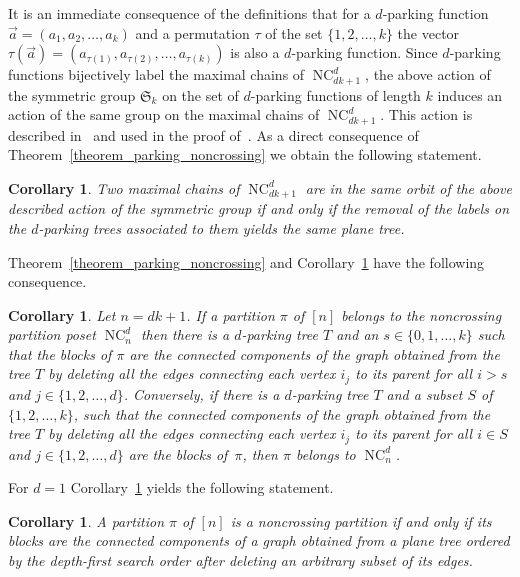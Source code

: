 \documentclass[11pt]{amsart}
\newtheorem{corollary}[theorem]{Corollary}
\numberwithin{equation}{section}
\DeclareMathOperator{\NC}{NC}
\begin{document}
It is an immediate consequence of the definitions that for a $d$-parking
function $\vec{a}=(a_{1},a_{2},\ldots,a_{k})$ 
and a permutation $\tau$ of the set $\{1,2,\ldots,k\}$ the vector
$\tau(\vec{a})=(a_{\tau(1)},a_{\tau(2)},\ldots,a_{\tau(k)})$ is also a
$d$-parking function. Since $d$-parking functions bijectively label the
maximal chains of $\NC^{d}_{dk+1}$, the above action of the symmetric
group $\mathfrak{S}_{k}$ on the set of $d$-parking functions of
length $k$ induces an action of the same group on the maximal chains of
$\NC^{d}_{dk+1}$. This action is described
in~\cite[Lemma~5.2]{Muhle_Nadeau_Williams} and used in the proof
of~\cite[Theorem~5.3]{Muhle_Nadeau_Williams}. As a direct consequence of
Theorem~\ref{theorem_parking_noncrossing} we obtain the following
statement.

\begin{corollary}
\label{corollary_permutations}  
Two maximal chains of $\NC^{d}_{dk+1}$ are in the same orbit of the
above described action of the symmetric group if and only if the
removal of the labels on the $d$-parking trees associated to them yields
the same plane tree. 
\end{corollary}   

Theorem~\ref{theorem_parking_noncrossing} and
Corollary~\ref{corollary_permutations} have the following consequence.

\begin{corollary}
\label{corollary_parkingblocks}
Let $n=dk+1$. If a partition $\pi$ of $[n]$ belongs to the noncrossing
partition poset $\NC^{d}_{n}$ then there is a $d$-parking tree
$T$ and an $s\in\{0,1,\ldots,k\}$ such that the blocks of $\pi$
are the connected components of the graph obtained from the tree $T$ by
deleting all the edges connecting each vertex $i_{j}$ to its parent
for all $i>s$ and $j\in\{1,2,\ldots,d\}$. Conversely, if there is a
$d$-parking tree $T$ and a subset $S$ of $\{1,2,\ldots,k\}$, such that
the connected components of the graph obtained from the tree $T$ by
deleting all the edges connecting each vertex $i_{j}$ to its parent
for all $i\in S$ and $j\in\{1,2,\ldots,d\}$ are the blocks of~$\pi$, then
$\pi$ belongs to $\NC^{d}_{n}$.
\end{corollary}  

For $d=1$ Corollary~\ref{corollary_parkingblocks} yields the following
statement. 

\begin{corollary}
\label{corollary_ncparkingblocks}
A partition $\pi$ of $[n]$ is a noncrossing partition
if and only if its blocks are the
connected components of a graph obtained from a plane tree ordered by
the depth-first search order after deleting an arbitrary subset of its
edges.
\end{corollary}  
\end{document}
